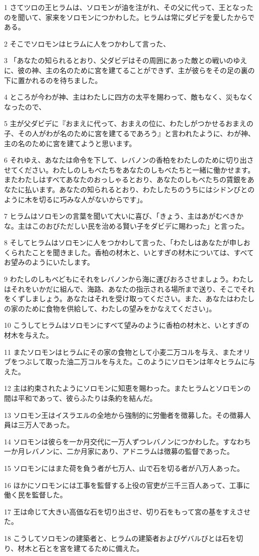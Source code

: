 \par 1 さてツロの王ヒラムは、ソロモンが油を注がれ、その父に代って、王となったのを聞いて、家来をソロモンにつかわした。ヒラムは常にダビデを愛したからである。
\par 2 そこでソロモンはヒラムに人をつかわして言った、
\par 3 「あなたの知られるとおり、父ダビデはその周囲にあった敵との戦いのゆえに、彼の神、主の名のために宮を建てることができず、主が彼らをその足の裏の下に置かれるのを待ちました。
\par 4 ところが今わが神、主はわたしに四方の太平を賜わって、敵もなく、災もなくなったので、
\par 5 主が父ダビデに『おまえに代って、おまえの位に、わたしがつかせるおまえの子、その人がわが名のために宮を建てるであろう』と言われたように、わが神、主の名のために宮を建てようと思います。
\par 6 それゆえ、あなたは命令を下して、レバノンの香柏をわたしのために切り出させてください。わたしのしもべたちをあなたのしもべたちと一緒に働かせます。またわたしはすべてあなたのおっしゃるとおり、あなたのしもべたちの賃銀をあなたに払います。あなたの知られるとおり、わたしたちのうちにはシドンびとのように木を切るに巧みな人がないからです」。
\par 7 ヒラムはソロモンの言葉を聞いて大いに喜び、「きょう、主はあがむべきかな。主はこのおびただしい民を治める賢い子をダビデに賜わった」と言った。
\par 8 そしてヒラムはソロモンに人をつかわして言った、「わたしはあなたが申しおくられたことを聞きました。香柏の材木と、いとすぎの材木については、すべてお望みのようにいたします。
\par 9 わたしのしもべどもにそれをレバノンから海に運びおろさせましょう。わたしはそれをいかだに組んで、海路、あなたの指示される場所まで送り、そこでそれをくずしましょう。あなたはそれを受け取ってください。また、あなたはわたしの家のために食物を供給して、わたしの望みをかなえてください」。
\par 10 こうしてヒラムはソロモンにすべて望みのように香柏の材木と、いとすぎの材木を与えた。
\par 11 またソロモンはヒラムにその家の食物として小麦二万コルを与え、またオリブをつぶして取った油二万コルを与えた。このようにソロモンは年々ヒラムに与えた。
\par 12 主は約束されたようにソロモンに知恵を賜わった。またヒラムとソロモンの間は平和であって、彼らふたりは条約を結んだ。
\par 13 ソロモン王はイスラエルの全地から強制的に労働者を徴募した。その徴募人員は三万人であった。
\par 14 ソロモンは彼らを一か月交代に一万人ずつレバノンにつかわした。すなわち一か月レバノンに、二か月家にあり、アドニラムは徴募の監督であった。
\par 15 ソロモンにはまた荷を負う者が七万人、山で石を切る者が八万人あった。
\par 16 ほかにソロモンには工事を監督する上役の官吏が三千三百人あって、工事に働く民を監督した。
\par 17 王は命じて大きい高価な石を切り出させ、切り石をもって宮の基をすえさせた。
\par 18 こうしてソロモンの建築者と、ヒラムの建築者およびゲバルびとは石を切り、材木と石とを宮を建てるために備えた。

